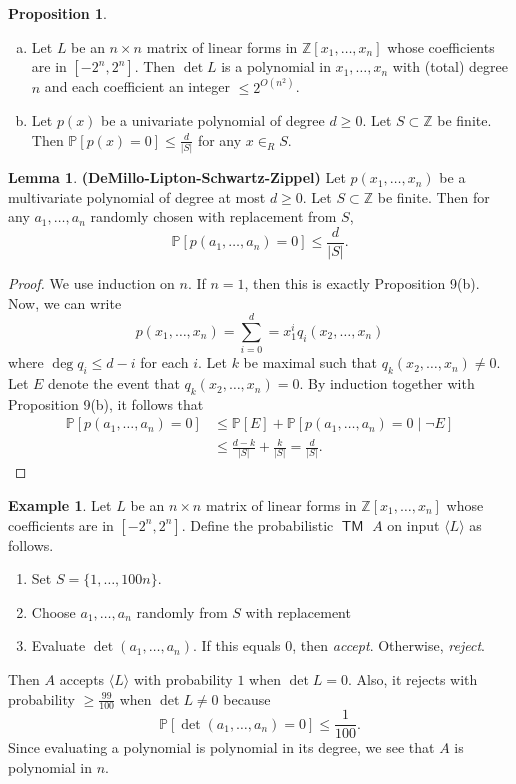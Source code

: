 \documentclass[10pt,letterpaper,cm]{nupset}
\theoremstyle{definition}
\newtheorem{exmp}{Example}
\newtheorem{prop}{Proposition}
\newtheorem{lemma}{Lemma}
\newcommand{\Z}{\mathbb Z}
\newcommand{\1}{\mathbf{1}}
\newcommand{\0}{\vec 0}
\DeclareMathOperator{\TM}{\mathsf{TM}}
\begin{document}
\begin{prop} $ $
\begin{enumerate}[(a)]
\item Let $L$ be an $n\times n$ matrix of linear forms in $\Z[x_1, \ldots, x_n]$ whose coefficients are in $[{-}2^n, 2^n]$. Then $\det{L}$ is a polynomial in $x_1, \ldots, x_n$ with (total) degree $n$ and each coefficient an integer $\leq 2^{O(n^2)}$.
\item Let $p(x)$ be a univariate polynomial of degree $d \geq 0$. Let $S\subset \Z$ be finite. Then $\mathbb{P}[p(x) =0] \leq \frac{d}{|S|}$ for any $x\in_R S$.
\end{enumerate}
\end{prop}

\begin{lemma}{\textbf{(DeMillo-Lipton-Schwartz-Zippel)}}
Let $p(x_1, \ldots, x_n)$ be a multivariate polynomial of degree at most $d\geq 0$. Let $S \subset \Z$ be finite. Then for any $a_1, \ldots, a_n$ randomly chosen with replacement from $S$, $$\mathbb{P}[p(a_1, \ldots, a_n) =0] \leq \frac{d}{|S|}.$$
\end{lemma}
\begin{proof}
We use induction on $n$. If $n=1$, then this is exactly Proposition 9(b). Now, we can write $$p(x_1, \ldots, x_n) = \sum_{i=0}^d = x_1^i q_i(x_2, \ldots, x_n)$$ where $\deg{q_i} \leq d-i$ for each $i$. Let $k$ be maximal such that $q_k(x_2, \ldots, x_n) \ne 0$. Let $E$ denote the event that $q_k(x_2, \ldots, x_n) =0$. 
By induction together with Proposition 9(b), it follows that  
\begin{align*} \mathbb{P}[p(a_1, \ldots, a_n) =0] & \leq \mathbb{P}[E] + \mathbb{P}[p(a_1, \ldots, a_n) =0 \mid \neg{E}]
\\ & \leq \frac{d-k}{|S|} + \frac{k}{|S|} = \frac{d}{|S|}.
\end{align*}
\end{proof}

\begin{exmp}
Let $L$ be an $n \times n$ matrix of linear forms in $\Z[x_1, \ldots, x_n]$ whose coefficients are in $[{-}2^n, 2^n]$. Define the probabilistic $\TM$ $A$ on input $\langle L \rangle$ as follows. 
\begin{enumerate}
\item Set $S = \{1, \ldots, 100n\}$.
\item Choose $a_1, \ldots, a_n$ randomly from $S$ with replacement
\item Evaluate $\det(a_1, \ldots, a_n)$.  If this equals $0$, then \textit{accept}. Otherwise, \textit{reject}.
\end{enumerate}
Then $A$ accepts $\langle L \rangle$ with probability $1$ when $\det{L} = 0$. Also, it rejects with probability $\geq \frac{99}{100}$ when $\det{L} \ne 0$ because $$\mathbb{P}[\det(a_1, \ldots, a_n) =0] \leq \frac{1}{100}.$$ Since evaluating a polynomial is polynomial in its degree, we see that $A$ is polynomial in $n$.
\end{exmp}
\end{document}
